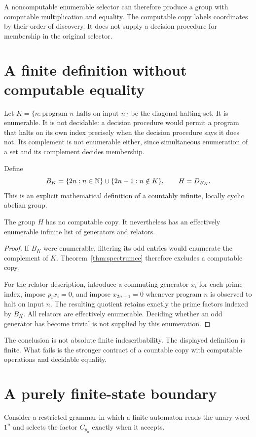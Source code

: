 A noncomputable enumerable selector can therefore produce a group with computable multiplication and equality. The computable copy labels coordinates by their order of discovery. It does not supply a decision procedure for membership in the original selector.

\section{A finite definition without computable equality}
Let $K=\{n:\text{program }n\text{ halts on input }n\}$ be the diagonal halting set. It is enumerable. It is not decidable: a decision procedure would permit a program that halts on its own index precisely when the decision procedure says it does not. Its complement is not enumerable either, since simultaneous enumeration of a set and its complement decides membership.

Define
\[
B_K=\{2n:n\in\mathbb N\}\cup\{2n+1:n\notin K\},
\qquad H=D_{B_K}.
\]
This is an explicit mathematical definition of a countably infinite, locally cyclic abelian group.

\begin{corollary}
\label{thm:noncompD}
The group $H$ has no computable copy. It nevertheless has an effectively enumerable infinite list of generators and relators.
\end{corollary}
\begin{proof}
If $B_K$ were enumerable, filtering its odd entries would enumerate the complement of $K$. Theorem~\ref{thm:spectrumce} therefore excludes a computable copy.

For the relator description, introduce a commuting generator $x_i$ for each prime index, impose $p_i x_i=0$, and impose $x_{2n+1}=0$ whenever program $n$ is observed to halt on input $n$. The resulting quotient retains exactly the prime factors indexed by $B_K$. All relators are effectively enumerable. Deciding whether an odd generator has become trivial is not supplied by this enumeration.
\end{proof}
The conclusion is not absolute finite indescribability. The displayed definition is finite. What fails is the stronger contract of a countable copy with computable operations and decidable equality.

\section{A purely finite-state boundary}
Consider a restricted grammar in which a finite automaton reads the unary word $1^n$ and selects the factor $C_{p_n}$ exactly when it accepts.

